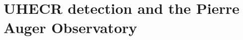 \chapter[UHECR detection and the Pierre Auger Observatory]{UHECR detection and the Pierre Auger Observatory}
\label{sec:auger}
